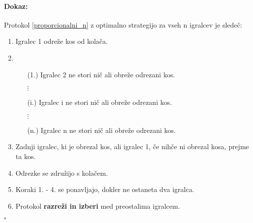 \documentclass[a4paper, 12pt]{article}
\newenvironment{dokaz}{\paragraph{Dokaz:}}{\hfill$\square$\\}
\begin{document}
	\begin{dokaz}
		Protokol \ref{proporcionalni_n} z optimalno strategijo za vseh n igralcev je sledeč:
		\begin{enumerate}
			
			\item Igralec 1 odreže kos od kolača.
			
			\item \begin{enumerate}
				
				\item[(1.)] Igralec 2 ne stori nič ali obreže odrezani kos.
				
				\item[] $\vdots$
				
				\item[(i.)] Igralec i ne stori nič ali obreže odrezani kos.
				
				\item[] $\vdots$
				
				\item[(n.)] Igralec n ne stori nič ali obreže odrezani kos.
				
			\end{enumerate}
			
			\item Zadnji igralec, ki je obrezal kos, ali igralec 1, če nihče ni obrezal kosa, prejme ta kos.
			
			\item Odrezke se združijo s kolačem.
			
			\item Koraki 1. - 4. se ponavljajo, dokler ne ostaneta dva igralca.
			
			\item Protokol \textbf{razreži in izberi} med preostalima igralcem.
			
		\end{enumerate}
	\end{dokaz}
\end{document}
